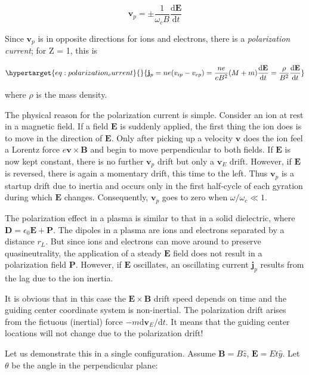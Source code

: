 \documentclass[
  notoc %
]{tufte-book}
\begin{document}
\[
\mathbf{v}_p = \pm \frac{1}{\omega_c B}\frac{\mathrm{d}\mathbf{E}}{\mathrm{d}t}
\]

Since \(\mathbf{v}_p\) is in opposite directions for ions and electrons,
there is a \emph{polarization current}; for Z = 1, this is

\begin{equation}\protect\hypertarget{eq:polarization_current}{}{
\mathbf{j}_p = ne(v_{ip} - v_{ep}) = \frac{ne}{eB^2}(M+m)\frac{\mathrm{d}\mathbf{E}}{\mathrm{d}t} = \frac{\rho}{B^2}\frac{\mathrm{d}\mathbf{E}}{\mathrm{d}t}
}\label{eq:polarization_current}\end{equation}

where \(\rho\) is the mass density.

The physical reason for the polarization current is simple. Consider an
ion at rest in a magnetic field. If a field \(\mathbf{E}\) is suddenly
applied, the first thing the ion does is to move in the direction of
\(\mathbf{E}\). Only after picking up a velocity \(\mathbf{v}\) does the
ion feel a Lorentz force \(e\mathbf{v}\times\mathbf{B}\) and begin to
move perpendicular to both fields. If \(\mathbf{E}\) is now kept
constant, there is no further \(\mathbf{v}_p\) drift but only a
\(\mathbf{v}_E\) drift. However, if \(\mathbf{E}\) is reversed, there is
again a momentary drift, this time to the left. Thus \(\mathbf{v}_p\) is
a startup drift due to inertia and occurs only in the first half-cycle
of each gyration during which \(\mathbf{E}\) changes. Consequently,
\(\mathbf{v}_p\) goes to zero when \(\omega/\omega_c \ll 1\).

The polarization effect in a plasma is similar to that in a solid
dielectric, where \(\mathbf{D} = \epsilon_0\mathbf{E} + \mathbf{P}\).
The dipoles in a plasma are ions and electrons separated by a distance
\(r_L\). But since ions and electrons can move around to preserve
quasineutrality, the application of a steady \(\mathbf{E}\) field does
not result in a polarization field \(\mathbf{P}\). However, if
\(\mathbf{E}\) oscillates, an oscillating current \(\mathbf{j}_p\)
results from the lag due to the ion inertia.

It is obvious that in this case the \(\mathbf{E}\times\mathbf{B}\) drift
speed depends on time and the guiding center coordinate system is
non-inertial. The polarization drift arises from the fictuous (inertial)
force \(-m \mathrm{d}\mathbf{v}_E/\mathrm{d}t\). It means that the
guiding center locations will not change due to the polarization drift!

Let us demonstrate this in a single configuration. Assume
\(\mathbf{B}=B\hat{z}\), \(\mathbf{E}=Et\hat{y}\). Let \(\theta\) be the
angle in the perpendicular plane:
\end{document}
